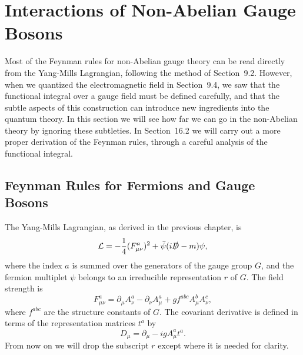 \section{Interactions of Non-Abelian Gauge Bosons}

Most of the Feynman rules for non-Abelian gauge theory can be read directly
from the Yang-Mills Lagrangian, following the method of Section~9.2.
However, when we quantized the electromagnetic field in Section~9.4, we saw
that the functional integral over a gauge field must be defined carefully, and
that the subtle aspects of this construction can introduce new ingredients
into the quantum theory.  In this section we will see how far we can go in
the non-Abelian theory by ignoring these subtleties.  In Section~16.2 we will
carry out a more proper derivation of the Feynman rules, through a careful
analysis of the functional integral.

\subsection{Feynman Rules for Fermions and Gauge Bosons}

The Yang-Mills Lagrangian, as derived in the previous chapter, is
\begin{equation}
  \mathcal{L} = -\frac{1}{4}(F^a_{\mu\nu})^2 + \bar{\psi}(i\slashed{D}
    - m)\psi ,
  \label{eq:16.1}
\end{equation}
where the index $a$ is summed over the generators of the gauge group $G$, and
the fermion multiplet $\psi$ belongs to an irreducible representation $r$ of
$G$.  The field strength is
\begin{equation}
  F^a_{\mu\nu} = \partial_\mu A^a_\nu - \partial_\nu A^a_\mu
    + gf^{abc}A^b_\mu A^c_\nu ,
  \label{eq:16.2}
\end{equation}
where $f^{abc}$ are the structure constants of $G$.  The covariant derivative
is defined in terms of the representation matrices $t^a$ by
\begin{equation}
  D_\mu = \partial_\mu - igA^a_\mu t^a .
  \label{eq:16.3}
\end{equation}
From now on we will drop the subscript $r$ except where it is needed for
clarity.

